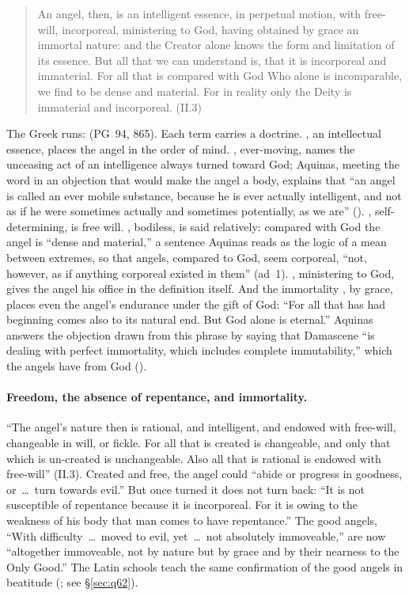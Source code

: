 \begin{quote}
An angel, then, is an intelligent essence, in perpetual motion, with
free-will, incorporeal, ministering to God, having obtained by grace an
immortal nature: and the Creator alone knows the form and limitation of its
essence. But all that we can understand is, that it is incorporeal and
immaterial. For all that is compared with God Who alone is incomparable, we
find to be dense and material. For in reality only the Deity is immaterial
and incorporeal. (II.3)
\end{quote}

\noindent The Greek runs:  (PG~94, 865). Each term carries a
doctrine. , an intellectual essence, places the angel in
the order of mind. , ever-moving, names the unceasing act
of an intelligence always turned toward God; Aquinas, meeting the word in an
objection that would make the angel a body, explains that ``an angel is
called an ever mobile substance, because he is ever actually intelligent,
and not as if he were sometimes actually and sometimes potentially, as we
are'' (). , self-determining, is
free will. , bodiless, is said relatively: compared with God
the angel is ``dense and material,'' a sentence Aquinas reads as the logic
of a mean between extremes, so that angels, compared to God, seem
corporeal, ``not, however, as if anything corporeal existed in them'' (ad~1).
, ministering to God, gives the angel his office in
the definition itself. And the immortality , by grace,
places even the angel's endurance under the gift of God: ``For all that has
had beginning comes also to its natural end. But God alone is eternal.''
Aquinas answers the objection drawn from this phrase by saying that
Damascene ``is dealing with perfect immortality, which includes complete
immutability,'' which the angels have from God ().

\paragraph{Freedom, the absence of repentance, and immortality.} ``The
angel's nature then is rational, and intelligent, and endowed with
free-will, changeable in will, or fickle. For all that is created is
changeable, and only that which is un-created is unchangeable. Also all that
is rational is endowed with free-will'' (II.3). Created and free, the angel
could ``abide or progress in goodness, or~\dots\ turn towards evil.'' But
once turned it does not turn back: ``It is not susceptible of repentance
because it is incorporeal. For it is owing to the weakness of his body that
man comes to have repentance.'' The good angels, ``With difficulty~\dots\
moved to evil, yet~\dots\ not absolutely immoveable,'' are now ``altogether
immoveable, not by nature but by grace and by their nearness to the Only
Good.'' The Latin schools teach the same confirmation of the good angels in
beatitude (\ST{I q.~62 a.~8}; see \S\ref{sec:q62}).

